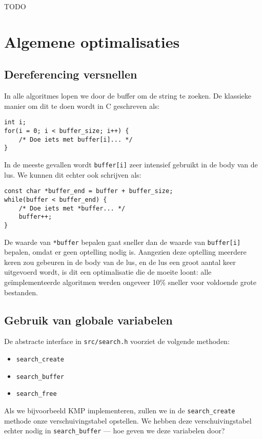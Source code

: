 \documentclass[a4paper,11pt]{article}
\begin{document}
TODO

\section{Algemene optimalisaties}

\subsection{Dereferencing versnellen}

In alle algoritmes lopen we door de buffer om de string te zoeken. De klassieke
manier om dit te doen wordt in C geschreven als:

\begin{verbatim}
int i;
for(i = 0; i < buffer_size; i++) {
    /* Doe iets met buffer[i]... */
}
\end{verbatim}

In de meeste gevallen wordt \verb#buffer[i]# zeer intensief gebruikt in de body
van de lus. We kunnen dit echter ook schrijven als:

\begin{verbatim}
const char *buffer_end = buffer + buffer_size;
while(buffer < buffer_end) {
    /* Doe iets met *buffer... */
    buffer++;
}
\end{verbatim}

De waarde van \verb#*buffer# bepalen gaat sneller dan de waarde van
\verb#buffer[i]# bepalen, omdat er geen optelling nodig is. Aangezien deze
optelling meerdere keren zou gebeuren in de body van de lus, en de lus een groot
aantal keer uitgevoerd wordt, is dit een optimalisatie die de moeite loont: alle
ge\"implementeerde algoritmen werden ongeveer 10\% sneller voor voldoende grote
bestanden.

\subsection{Gebruik van globale variabelen}

De abstracte interface in \verb#src/search.h# voorziet de volgende methoden:

\begin{itemize}
    \item \verb#search_create#
    \item \verb#search_buffer#
    \item \verb#search_free#
\end{itemize}

Als we bijvoorbeeld KMP implementeren, zullen we in de \verb#search_create#
methode onze verschuivingstabel opstellen. We hebben deze verschuivingstabel
echter nodig in \verb#search_buffer# — hoe geven we deze variabelen door?
\end{document}
